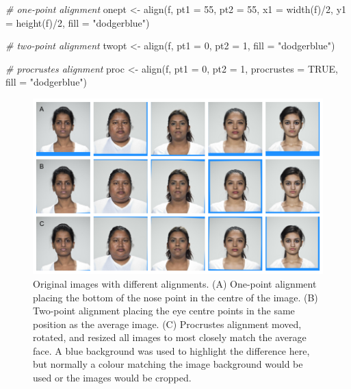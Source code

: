 \documentclass[
  doc,floatsintext]{apa6}
\newenvironment{Shaded}{\begin{snugshade}}{\end{snugshade}}
\newcommand{\AttributeTok}[1]{\textcolor[rgb]{0.77,0.63,0.00}{#1}}
\newcommand{\CommentTok}[1]{\textcolor[rgb]{0.56,0.35,0.01}{\textit{#1}}}
\newcommand{\ConstantTok}[1]{\textcolor[rgb]{0.00,0.00,0.00}{#1}}
\newcommand{\DecValTok}[1]{\textcolor[rgb]{0.00,0.00,0.81}{#1}}
\newcommand{\FunctionTok}[1]{\textcolor[rgb]{0.00,0.00,0.00}{#1}}
\newcommand{\NormalTok}[1]{#1}
\newcommand{\OtherTok}[1]{\textcolor[rgb]{0.56,0.35,0.01}{#1}}
\newcommand{\SpecialCharTok}[1]{\textcolor[rgb]{0.00,0.00,0.00}{#1}}
\newcommand{\StringTok}[1]{\textcolor[rgb]{0.31,0.60,0.02}{#1}}
\begin{document}
\begin{Shaded}
\begin{Highlighting}[]
\CommentTok{\# one{-}point alignment}
\NormalTok{onept }\OtherTok{\textless{}{-}} \FunctionTok{align}\NormalTok{(f, }\AttributeTok{pt1 =} \DecValTok{55}\NormalTok{, }\AttributeTok{pt2 =} \DecValTok{55}\NormalTok{,}
               \AttributeTok{x1 =} \FunctionTok{width}\NormalTok{(f)}\SpecialCharTok{/}\DecValTok{2}\NormalTok{, }\AttributeTok{y1 =} \FunctionTok{height}\NormalTok{(f)}\SpecialCharTok{/}\DecValTok{2}\NormalTok{,}
               \AttributeTok{fill =} \StringTok{"dodgerblue"}\NormalTok{)}

\CommentTok{\# two{-}point alignment}
\NormalTok{twopt }\OtherTok{\textless{}{-}} \FunctionTok{align}\NormalTok{(f, }\AttributeTok{pt1 =} \DecValTok{0}\NormalTok{, }\AttributeTok{pt2 =} \DecValTok{1}\NormalTok{, }\AttributeTok{fill =} \StringTok{"dodgerblue"}\NormalTok{)}

\CommentTok{\# procrustes alignment}
\NormalTok{proc }\OtherTok{\textless{}{-}} \FunctionTok{align}\NormalTok{(f, }\AttributeTok{pt1 =} \DecValTok{0}\NormalTok{, }\AttributeTok{pt2 =} \DecValTok{1}\NormalTok{, }\AttributeTok{procrustes =} \ConstantTok{TRUE}\NormalTok{, }\AttributeTok{fill =} \StringTok{"dodgerblue"}\NormalTok{)}
\end{Highlighting}
\end{Shaded}

\begin{figure}
\includegraphics[width=1\linewidth]{index_files/figure-latex/norm-comp-1} \caption{Original images with different alignments. (A) One-point alignment placing the bottom of the nose point in the centre of the image. (B) Two-point alignment placing the eye centre points in the same position as the average image. (C) Procrustes alignment moved, rotated, and resized all images to most closely match the average face. A blue background was used to highlight the difference here, but normally a colour matching the image background would be used or the images would be cropped.}\label{fig:norm-comp}
\end{figure}
\end{document}
